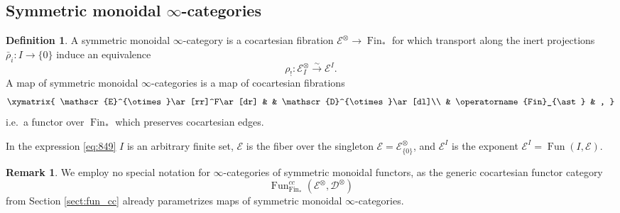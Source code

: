 \documentclass[reqno]{amsart}
\theoremstyle{definition}
\newtheorem{definition}[lemma]{Definition}
\newtheorem{remark}[lemma]{Remark}
\newcommand{\msc}[1]{\mathscr{#1}}
\newcommand{\opn}[1]{\operatorname{#1}}
\newcommand{\ot}{\otimes}
\DeclareMathOperator{\Fun}{Fun}
\renewcommand{\1}{\mathbf{1}}
\begin{document}
\subsection{Symmetric monoidal $\infty$-categories}

\begin{definition}\label{def:sm}
A symmetric monoidal $\infty$-category is a cocartesian fibration $\msc{E}^{\ot}\to \opn{Fin}_{\ast}$ for which transport along the inert projections $\bar{\rho}_i:I\to \{0\}$ induce an equivalence
\begin{equation}\label{eq:849}
\rho_!:\msc{E}^{\ot}_I\overset{\sim}\to \msc{E}^I.
\end{equation}
A map of symmetric monoidal $\infty$-categories is a map of cocartesian fibrations
\[
\xymatrix{
\msc{E}^{\ot}\ar[rr]^F\ar[dr] & & \msc{D}^{\ot}\ar[dl]\\
	& \opn{Fin}_{\ast} & ,
}
\]
i.e.\ a functor over $\opn{Fin}_{\ast}$ which preserves cocartesian edges.
\end{definition}

In the expression \eqref{eq:849} $I$ is an arbitrary finite set, $\msc{E}$ is the fiber over the singleton $\msc{E}=\msc{E}^{\ot}_{\{0\}}$, and $\msc{E}^I$ is the exponent $\msc{E}^I=\Fun(I,\msc{E})$.

\begin{remark}
We employ no special notation for $\infty$-categories of symmetric monoidal functors, as the generic cocartesian functor category
\[
\Fun_{\opn{Fin}_{\ast}}^{cc}(\msc{E}^{\ot},\msc{D}^{\ot})
\]
from Section \ref{sect:fun_cc} already parametrizes maps of symmetric monoidal $\infty$-categories.
\end{remark}
\end{document}
